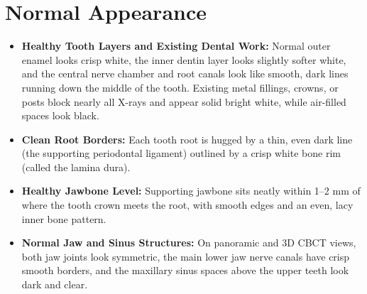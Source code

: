 \section{Normal Appearance}
\begin{itemize}
\item \textbf{Healthy Tooth Layers and Existing Dental Work:} Normal outer enamel looks crisp white, the inner dentin layer looks slightly softer white, and the central nerve chamber and root canals look like smooth, dark lines running down the middle of the tooth. Existing metal fillings, crowns, or posts block nearly all X-rays and appear solid bright white, while air-filled spaces look black.
\item \textbf{Clean Root Borders:} Each tooth root is hugged by a thin, even dark line (the supporting periodontal ligament) outlined by a crisp white bone rim (called the lamina dura).
\item \textbf{Healthy Jawbone Level:} Supporting jawbone sits neatly within 1--2 mm of where the tooth crown meets the root, with smooth edges and an even, lacy inner bone pattern.
\item \textbf{Normal Jaw and Sinus Structures:} On panoramic and 3D CBCT views, both jaw joints look symmetric, the main lower jaw nerve canals have crisp smooth borders, and the maxillary sinus spaces above the upper teeth look dark and clear.
\end{itemize}


